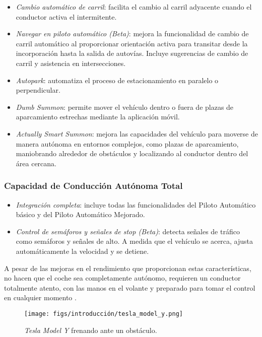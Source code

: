 \begin{itemize}
    \item \textit{Cambio automático de carril}: facilita el cambio al carril adyacente cuando el conductor activa el intermitente.
    \item \textit{Navegar en piloto automático (Beta)}: mejora la funcionalidad de cambio de carril automático al proporcionar orientación activa para transitar desde la incorporación hasta la salida de autovías. Incluye sugerencias de cambio de carril y asistencia en intersecciones.
    \item \textit{Autopark}: automatiza el proceso de estacionamiento en paralelo o perpendicular.
    \item \textit{Dumb Summon}: permite mover el vehículo dentro o fuera de plazas de aparcamiento estrechas mediante la aplicación móvil.
    \item \textit{Actually Smart Summon}: mejora las capacidades del vehículo para moverse de manera autónoma en entornos complejos, como plazas de aparcamiento, maniobrando alrededor de obstáculos y localizando al conductor dentro del área cercana.
\end{itemize}

\subsubsection{Capacidad de Conducción Autónoma Total}

\begin{itemize}
    \item \textit{Integración completa}: incluye todas las funcionalidades del Piloto Automático básico y del Piloto Automático Mejorado.
    \item \textit{Control de semáforos y señales de stop (Beta)}: detecta señales de tráfico como semáforos y señales de alto. A medida que el vehículo se acerca, ajusta automáticamente la velocidad y se detiene.
\end{itemize}

A pesar de las mejoras en el rendimiento que proporcionan estas características, no hacen que el coche sea completamente autónomo, requieren un conductor totalmente atento, con las manos en el volante y preparado para tomar el control en cualquier momento \cite{tesla-autopilot}.

\begin{figure}[ht]
  \begin{center}
    \texttt{[image: figs/introducción/tesla\_model\_y.png]}
  \end{center}
  \caption{\textit{Tesla Model Y} frenando ante un obstáculo.}
  \label{tesla}
\end{figure}

